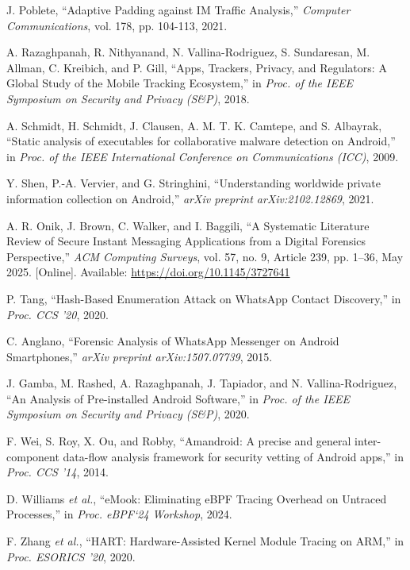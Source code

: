 \documentclass[a4paper,12pt]{report}
\begin{document}
\begin{thebibliography}{99}
J. Poblete, “Adaptive Padding against IM Traffic Analysis,” \emph{Computer Communications}, vol. 178, pp. 104-113, 2021.

A. Razaghpanah, R. Nithyanand, N. Vallina-Rodriguez, S. Sundaresan, M. Allman, C. Kreibich, and P. Gill, “Apps, Trackers, Privacy, and Regulators: A Global Study of the Mobile Tracking Ecosystem,” in \emph{Proc. of the IEEE Symposium on Security and Privacy (S\&P)}, 2018.

A. Schmidt, H. Schmidt, J. Clausen, A. M. T. K. Camtepe, and S. Albayrak, “Static analysis of executables for collaborative malware detection on Android,” in \emph{Proc. of the IEEE International Conference on Communications (ICC)}, 2009.

Y. Shen, P.-A. Vervier, and G. Stringhini, ``Understanding worldwide private information collection on Android,'' \emph{arXiv preprint arXiv:2102.12869}, 2021.

A. R. Onik, J. Brown, C. Walker, and I. Baggili, “A Systematic Literature Review of Secure Instant Messaging Applications from a Digital Forensics Perspective,” \emph{ACM Computing Surveys}, vol. 57, no. 9, Article 239, pp. 1–36, May 2025. [Online]. Available: \url{https://doi.org/10.1145/3727641}

P. Tang, “Hash-Based Enumeration Attack on WhatsApp Contact Discovery,” in \emph{Proc. CCS '20}, 2020.

C. Anglano, ``Forensic Analysis of WhatsApp Messenger on Android Smartphones,'' \emph{arXiv preprint arXiv:1507.07739}, 2015.

J. Gamba, M. Rashed, A. Razaghpanah, J. Tapiador, and N. Vallina-Rodriguez, “An Analysis of Pre-installed Android Software,” in \emph{Proc. of the IEEE Symposium on Security and Privacy (S\&P)}, 2020.

F. Wei, S. Roy, X. Ou, and Robby, “Amandroid: A precise and general inter-component data-flow analysis framework for security vetting of Android apps,” in \emph{Proc. CCS '14}, 2014.

D. Williams \emph{et al.}, “eMook: Eliminating eBPF Tracing Overhead on Untraced Processes,” in \emph{Proc. eBPF‘24 Workshop}, 2024.

F. Zhang \emph{et al.}, “HART: Hardware-Assisted Kernel Module Tracing on ARM,” in \emph{Proc. ESORICS '20}, 2020.


\end{thebibliography}
\end{document}
